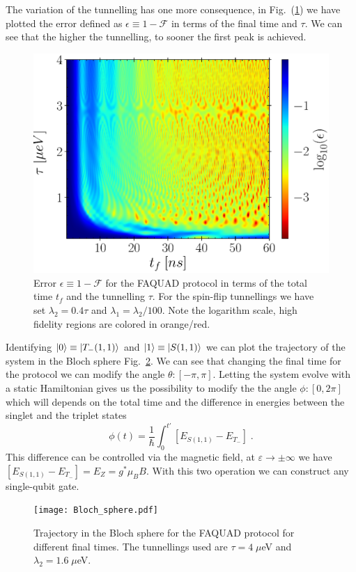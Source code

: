 \documentclass[a4paper,11pt]{article}
\begin{document}
The variation of the tunnelling has one more consequence, in Fig.~(\ref{fig:FAQUAD_DQD_Tunnelling}) we have plotted the error defined as $\epsilon\equiv 1-\mathcal{F}$ in terms of the final time and $\tau$. We can see that the higher the tunnelling, to sooner the first peak is achieved.
\begin{figure}[!htbp]
	\centering
	\includegraphics[width=0.7\linewidth]{FAQUAD_DQD_Tunnelling.eps}
	\caption{Error $\epsilon\equiv 1-\mathcal{F}$ for the FAQUAD protocol in terms of the total time $t_f$ and the tunnelling $\tau$. For the spin-flip tunnellings we have set $\lambda_2=0.4\tau$ and $\lambda_1=\lambda_2/100$. Note the logarithm scale, high fidelity regions are colored in orange/red.}
	\label{fig:FAQUAD_DQD_Tunnelling}
\end{figure}

Identifying $\ket{0}\equiv \ket{T_-(1,1)}$ and $\ket{1}\equiv \ket{S(1,1)}$ we can plot the trajectory of the system in the Bloch sphere Fig.~\ref{fig:Bloch_sphere}. We can see that changing the final time for the protocol we can modify the angle $\theta:[-\pi,\pi]$. Letting the system evolve with a static Hamiltonian gives us the possibility to modify the the angle $\phi:[0,2\pi]$ which will depends on the total time and the difference in energies between the singlet and the triplet states
\begin{equation}
	\phi(t)=\frac{1}{\hbar}\int_0^{t'}[E_{S(1,1)}-E_{T_-}]\; .
\end{equation}
This difference can be controlled via the magnetic field, at $\varepsilon\rightarrow\pm\infty$ we have $[E_{S(1,1)}-E_{T_-}]=E_Z=g^*\mu_B B$. With this two operation we can construct any single-qubit gate.
\begin{figure}[!htbp]
	\centering
	\texttt{[image: Bloch\_sphere.pdf]}
	\caption{Trajectory in the Bloch sphere for the FAQUAD protocol for different final times. The tunnellings used are $\tau=4\; \mu$eV and $\lambda_2=1.6\; \mu$eV.}
	\label{fig:Bloch_sphere}
\end{figure}
\end{document}
